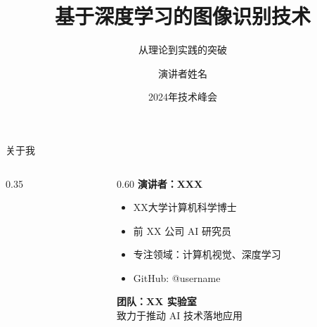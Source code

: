 \documentclass[aspectratio=169,11pt]{beamer}
\title{\textbf{基于深度学习的图像识别技术}}
\subtitle{从理论到实践的突破}
\author{演讲者姓名}
\institute{XX实验室 / XX公司}
\date{2024年技术峰会}
\begin{document}
\begin{frame}
    \titlepage
\end{frame}

\begin{frame}{关于我}
    \begin{columns}[T]
        \begin{column}{0.35\textwidth}
            \centering
        \end{column}
        \begin{column}{0.60\textwidth}
            \textbf{演讲者：XXX}
            \begin{itemize}
                \item XX大学计算机科学博士
                \item 前 XX 公司 AI 研究员
                \item 专注领域：计算机视觉、深度学习
                \item GitHub: @username
            \end{itemize}
            
            \vspace{0.5em}
            \textbf{团队：XX 实验室}\\
            致力于推动 AI 技术落地应用
        \end{column}
    \end{columns}
\end{frame}
\end{document}
